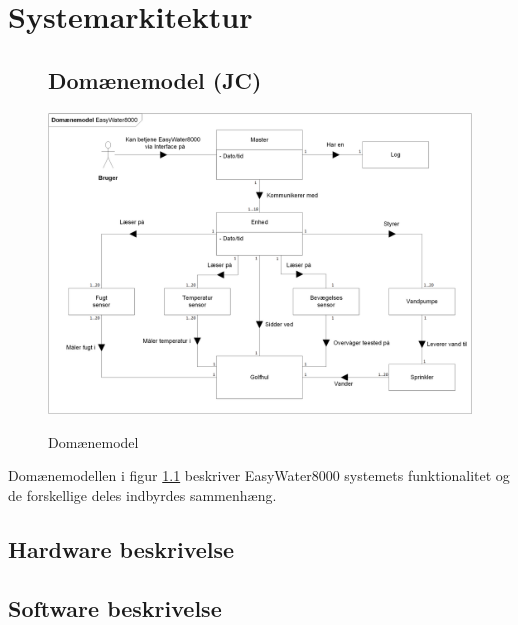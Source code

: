 \chapter{Systemarkitektur}

\begin{figure}[htbp] \centering
\section{Domænemodel (JC)}
{\includegraphics[width=\textwidth]{filer/systemarkitektur/Domainmodel}}
\caption{Domænemodel}
\label{lab:domainmodel}
\end{figure}
Domænemodellen i figur \ref{lab:domainmodel} beskriver EasyWater8000 systemets funktionalitet og de forskellige deles indbyrdes sammenhæng. 

\newpage
\section{Hardware beskrivelse}


\clearpage
\section{Software beskrivelse}
